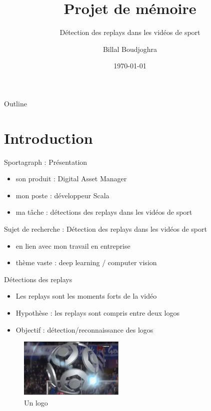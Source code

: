\documentclass[presentation]{beamer}
\author{Billal Boudjoghra}
\date{\today}
\title{Projet de mémoire}
\subtitle{Détection des replays dans les vidéos de sport}
\begin{document}
\maketitle
\begin{frame}{Outline}
\tableofcontents
\end{frame}


\section{Introduction}
\label{sec:org4ed27ed}
\begin{frame}[label={sec:org48b718a}]{Sportagraph : Présentation}
\begin{itemize}
\item son produit : Digital Asset Manager
\item mon poste : développeur Scala
\item ma tâche : détections des replays dans les vidéos de sport
\end{itemize}
\end{frame}

\begin{frame}[label={sec:org19d0132}]{Sujet de recherche : Détection des replays dans les vidéos de sport}
\begin{itemize}
\item en lien avec mon travail en entreprise
\item thème vaste : deep learning / computer vision
\end{itemize}
\end{frame}

\begin{frame}[label={sec:org410eea3}]{Détections des replays}
\begin{itemize}
\item Les replays sont les moments forts de la vidéo
\item Hypothèse : les replays sont compris entre deux logos
\item Objectif : détection/reconnaissance des logos
\end{itemize}
\begin{figure}[htbp]
\centering
\includegraphics[width=5cm]{logo_ex.png}
\caption{Un logo}
\end{figure}
\end{frame}
\end{document}
